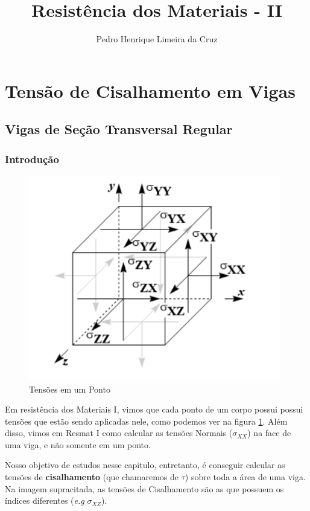 \documentclass{article}
\author{Pedro Henrique Limeira da Cruz}
\title{Resistência dos Materiais - II}
\begin{document}
\maketitle
\thispagestyle{empty}


\newpage
\tableofcontents
\newpage

\section{Tensão de Cisalhamento em Vigas}
\subsection{Vigas de Seção Transversal Regular}

\subsubsection{Introdução}
\begin{figure}
\vspace{-15px}
\centering
\includegraphics[width=.25\textwidth]{imgs/tensões.png}
\vspace{-15px}
\caption{Tensões em um Ponto}
\label{img:tensions}
\end{figure}
Em resistência dos Materiais I, vimos que cada ponto de um corpo possui possui tensões que estão sendo aplicadas nele, como podemos ver na figura \ref{img:tensions}. Além disso, vimos em Resmat I como calcular as tensões Normais ($\sigma_{XX}$) na face de uma viga, e não somente em um ponto.

Nosso objetivo de estudos nesse capitulo, entretanto, é conseguir calcular as tensões de \textbf{cisalhamento} (que chamaremos de $\tau$) sobre toda a área de uma viga. Na imagem supracitada, as tensões de Cisalhamento são as que possuem os índices diferentes (\emph{e.g} $\sigma _{XZ}$).
\end{document}
